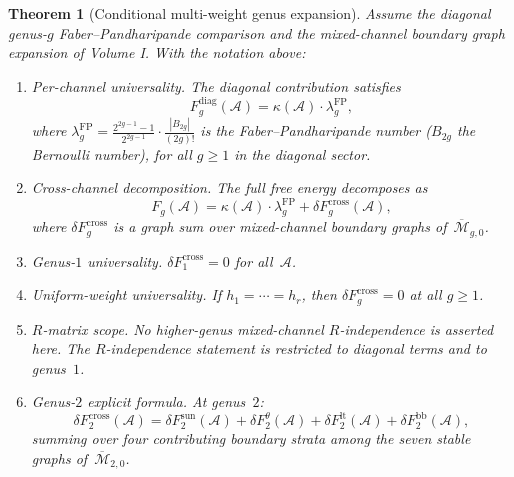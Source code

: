 \documentclass[11pt,reqno]{amsart}
\newtheorem{theorem}{Theorem}[section]
\theoremstyle{definition}
\theoremstyle{remark}
\newcommand{\cA}{\mathcal{A}}
\newcommand{\Mbar}{\overline{\mathcal{M}}}
\numberwithin{equation}{section}
\begin{document}
\begin{theorem}[Conditional multi-weight genus expansion]
\label{thm:multi-weight}
Assume the diagonal genus-$g$ Faber--Pandharipande comparison and the
mixed-channel boundary graph expansion of Volume I. With the notation
above:
\begin{enumerate}[\upshape(i)]
\item \emph{Per-channel universality.}
 The diagonal contribution satisfies
 \begin{equation}\label{eq:diag}
 F_g^{\mathrm{diag}}(\cA) = \kappa(\cA)\cdot
 \lambda_g^{\mathrm{FP}},
 \end{equation}
 where $\lambda_g^{\mathrm{FP}}
 = \frac{2^{2g-1}-1}{2^{2g-1}}\cdot
 \frac{|B_{2g}|}{(2g)!}$ is the Faber--Pandharipande
 number ($B_{2g}$ the Bernoulli number), for all
 $g \ge 1$ in the diagonal sector.

\item \emph{Cross-channel decomposition.}
 The full free energy decomposes as
 \begin{equation}\label{eq:decomposition}
 F_g(\cA) = \kappa(\cA)\cdot\lambda_g^{\mathrm{FP}}
 + \delta F_g^{\mathrm{cross}}(\cA),
 \end{equation}
 where $\delta F_g^{\mathrm{cross}}$ is a graph sum over
 mixed-channel boundary graphs of~$\Mbar_{g,0}$.

\item \emph{Genus-$1$ universality.}
 $\delta F_1^{\mathrm{cross}} = 0$ for all~$\cA$.

\item \emph{Uniform-weight universality.}
 If $h_1 = \cdots = h_r$, then
 $\delta F_g^{\mathrm{cross}} = 0$ at all $g \ge 1$.

\item \emph{$R$-matrix scope.}
 No higher-genus mixed-channel $R$-independence is asserted here.
 The $R$-independence statement is restricted to diagonal terms and
 to genus~$1$.

\item \emph{Genus-$2$ explicit formula.}
 At genus~$2$:
 \begin{equation}\label{eq:genus2-cross}
 \delta F_2^{\mathrm{cross}}(\cA)
 = \delta F_2^{\mathrm{sun}}(\cA)
 + \delta F_2^{\theta}(\cA)
 + \delta F_2^{\mathrm{lt}}(\cA)
 + \delta F_2^{\mathrm{bb}}(\cA),
 \end{equation}
 summing over four contributing boundary strata among the
 seven stable graphs of~$\Mbar_{2,0}$.
\end{enumerate}
\end{theorem}
\end{document}
